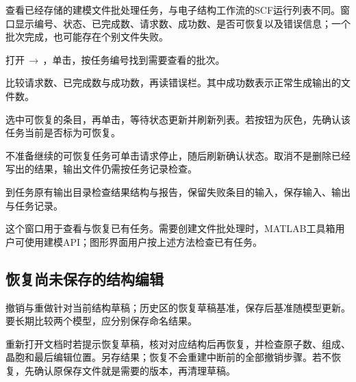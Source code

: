 查看已经存储的建模文件批处理任务，与电子结构工作流的SCF运行列表不同。窗口显示编号、状态、已完成数、请求数、成功数、是否可恢复以及错误信息；一个批次完成，也可能存在个别文件失败。

\begin{steps}
  \item 打开\,$\rightarrow$\,，单击，按任务编号找到需要查看的批次。
  \item 比较请求数、已完成数与成功数，再读错误栏。其中成功数表示正常生成输出的文件数。
  \item 选中可恢复的条目，再单击，等待状态更新并刷新列表。若按钮为灰色，先确认该任务当前是否标为可恢复。
  \item 不准备继续的可恢复任务可单击请求停止，随后刷新确认状态。取消不是删除已经写出的结果，输出文件仍需按任务记录检查。
  \item 到任务原有输出目录检查结果结构与报告，保留失败条目的输入，保存输入、输出与任务记录。
\end{steps}

这个窗口用于查看与恢复已有任务。需要创建文件批处理时，MATLAB\regmark{}工具箱用户可使用建模API；图形界面用户按上述方法检查已有任务。

\subsection{恢复尚未保存的结构编辑}\label{sec:modeling-draft-reference}

撤销与重做针对当前结构草稿；历史区的恢复草稿基准，保存后基准随模型更新。要长期比较两个模型，应分别保存命名结果。

重新打开文档时若提示恢复草稿，核对对应结构后再恢复，并检查原子数、组成、晶胞和最后编辑位置。另存结果；恢复不会重建中断前的全部撤销步骤。若不恢复，先确认原保存文件就是需要的版本，再清理草稿。

